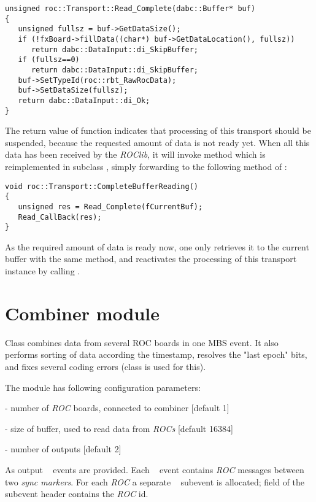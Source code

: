 \begin{verbatim}
unsigned roc::Transport::Read_Complete(dabc::Buffer* buf)
{
   unsigned fullsz = buf->GetDataSize();
   if (!fxBoard->fillData((char*) buf->GetDataLocation(), fullsz)) 
      return dabc::DataInput::di_SkipBuffer;
   if (fullsz==0) 
      return dabc::DataInput::di_SkipBuffer;
   buf->SetTypeId(roc::rbt_RawRocData);
   buf->SetDataSize(fullsz);
   return dabc::DataInput::di_Ok;
}
\end{verbatim}

The return value 
of function  indicates 
that processing of this transport should be suspended, 
because the requested amount of data is not ready yet.
When all this data has been received by the {\em ROClib},
it will invoke method  
which is reimplemented in subclass ,
simply forwarding to
the following method of : 

\begin{verbatim}
void roc::Transport::CompleteBufferReading()
{
   unsigned res = Read_Complete(fCurrentBuf);
   Read_CallBack(res);
}
\end{verbatim}

As the required amount of data is ready now,
one only retrieves it to the current buffer with the same 
 method, and 
reactivates the processing of this transport instance
by calling .   


\section{Combiner module}

Class  combines data from several ROC boards in one MBS event. It also performs sorting of data according the timestamp, resolves the "last epoch" bits, and fixes several coding errors (class  is
used for this).

The module has following configuration parameters:
\bbul
\item {}     - number of {\em ROC} boards, connected to combiner [default 1]  
\item {}  - size of buffer, used to read data from {\em ROCs} [default 16384]
\item {}  - number of outputs [default 2]
\ebul

As output \mbs~ events are provided. Each \mbs~ event contains {\em ROC} messages between two {\em sync markers}.
For each {\em ROC} a separate \mbs~ subevent is allocated; 
field  of the subevent header contains the {\em ROC} id.


